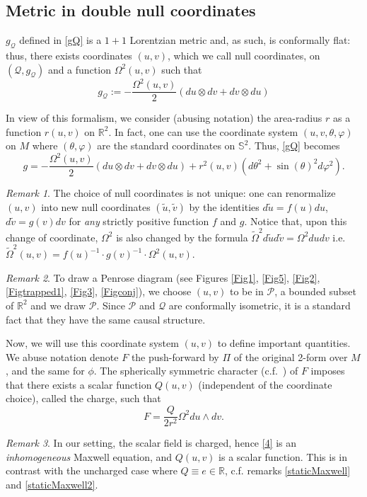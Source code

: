 \documentclass[10pt,a4paper]{article}
\theoremstyle{plain}
\theoremstyle{remark}
\newtheorem{rmk}{Remark}[section]
\theoremstyle{definition}
\newcommand{\RR}{\mathbb{R}}
\theoremstyle{plain}
\theoremstyle{remark}
\theoremstyle{definition}
\numberwithin{equation}{section}
\begin{document}
\subsection{Metric in double null coordinates} \label{doublenull}
$g_{\mathcal{Q}}$ defined in \eqref{gQ} is a $1+1$ Lorentzian metric and, as such, is conformally flat: thus, there exists coordinates $(u,v)$, which we call null coordinates, on $(\mathcal{Q},g_{\mathcal{Q}})$ and a function $\Omega^2(u,v)$ such that $$ g_{\mathcal{Q}}:= - \frac{\Omega^{2}(u,v)}{2} (du  \otimes dv+dv  \otimes du)$$ 

In view of this formalism, we consider (abusing notation) the area-radius $r$ as a function $r(u,v)$ on $\RR^2$. In fact, one can use the coordinate system $(u,v,\theta,\varphi)$ on $M$ where $(\theta,\varphi)$ are the standard coordinates on $\mathbb{S}^2$. Thus, \eqref{gQ} becomes $$ g = - \frac{\Omega^{2}(u,v)}{2} (du  \otimes dv+dv  \otimes du)+ r^2(u,v) (d\theta^2+\sin(\theta)^2 d \varphi ^2).$$

\begin{rmk} \label{doublenullremark}
	The choice of null coordinates is not unique: one can renormalize $(u,v)$ into new null coordinates $(\tilde{u},\tilde{v})$ by the identities $d\tilde{u}= f(u) du$, $d\tilde{v}= g(v) dv$ for \textit{any} strictly positive function $f$ and $g$. Notice that, upon this change of coordinate, $\Omega^2$ is also changed by the formula $\tilde{\Omega}^2 d\tilde{u} d\tilde{v} = \Omega^2 du dv$ i.e.\ $\tilde{\Omega}^2(u,v) = f(u)^{-1}  \cdot g(v)^{-1} \cdot  \Omega^2(u,v)$.
\end{rmk}

\begin{rmk} \label{penrosediagramremark}
	To draw a Penrose diagram (see Figures \ref{Fig1}, \ref{Fig5}, \ref{Fig2}, \ref{Figtrapped1}, \ref{Fig3}, \ref{Figconj}), we choose $(u,v)$ to be in $\mathcal{P}$, a bounded subset of $\RR^2$ and we draw $\mathcal{P}$. Since $\mathcal{P}$ and $\mathcal{Q}$ are conformally isometric, it is a standard fact that they have the same causal structure.
\end{rmk}

Now, we will use this coordinate system $(u,v)$ to define important quantities. We abuse notation denote  $F$ the push-forward by $\Pi$ of the original 2-form over $M$, and the same for $\phi$. The spherically symmetric character (c.f.\ \cite{Kommemi}) of $F$ imposes that there exists a scalar function $Q(u,v)$ (independent of the coordinate choice), called the charge, such that  $$ F= \frac{Q}{2r^{2}}  \Omega^{2} du \wedge dv.$$
\begin{rmk}
	In our setting, the scalar field is charged, hence \eqref{4} is an \textit{inhomogeneous} Maxwell equation, and $Q(u,v)$ is a scalar function. This is in contrast with the uncharged case where $Q \equiv e \in \RR$, c.f. remarks \ref{staticMaxwell} and \ref{staticMaxwell2}.
\end{rmk}
\end{document}
